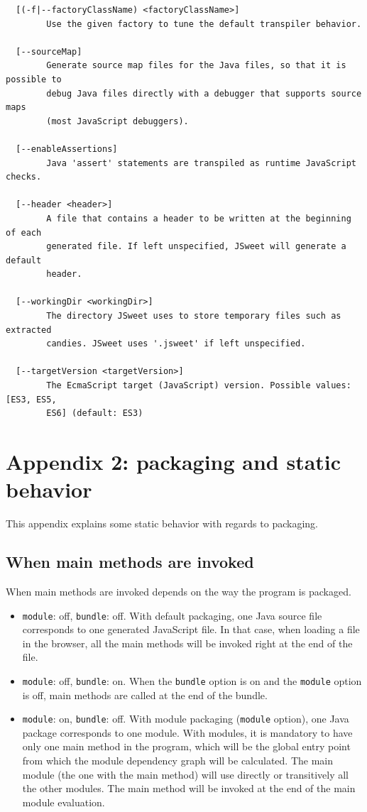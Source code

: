 \documentclass[a4paper]{report}
\begin{document}
\begin{small}
\begin{verbatim}
  [(-f|--factoryClassName) <factoryClassName>]
        Use the given factory to tune the default transpiler behavior.

  [--sourceMap]
        Generate source map files for the Java files, so that it is possible to
        debug Java files directly with a debugger that supports source maps
        (most JavaScript debuggers).

  [--enableAssertions]
        Java 'assert' statements are transpiled as runtime JavaScript checks.

  [--header <header>]
        A file that contains a header to be written at the beginning of each
        generated file. If left unspecified, JSweet will generate a default
        header.

  [--workingDir <workingDir>]
        The directory JSweet uses to store temporary files such as extracted
        candies. JSweet uses '.jsweet' if left unspecified.

  [--targetVersion <targetVersion>]
        The EcmaScript target (JavaScript) version. Possible values: [ES3, ES5,
        ES6] (default: ES3)
\end{verbatim}
\end{small}
       
\chapter*{Appendix 2: packaging and static behavior}

This appendix explains some static behavior with regards to packaging.

\section*{When main methods are invoked}

When main methods are invoked depends on the way the program is packaged. 

\begin{itemize}
\item \texttt{module}: off, \texttt{bundle}: off. With default packaging, one Java source file corresponds to one generated JavaScript file. In that case, when loading a file in the browser, all the main methods will be invoked right at the end of the file. 
\item \texttt{module}: off, \texttt{bundle}: on. When the \texttt{bundle} option is on and the \texttt{module} option is off, main methods are called at the end of the bundle.
\item \texttt{module}: on, \texttt{bundle}: off. With module packaging (\texttt{module} option), one Java package corresponds to one module. With modules, it is mandatory to have only one main method in the program, which will be the global entry point from which the module dependency graph will be calculated. The main module (the one with the main method) will use directly or transitively all the other modules. The main method will be invoked at the end of the main module evaluation.
\end{itemize}
\end{document}
